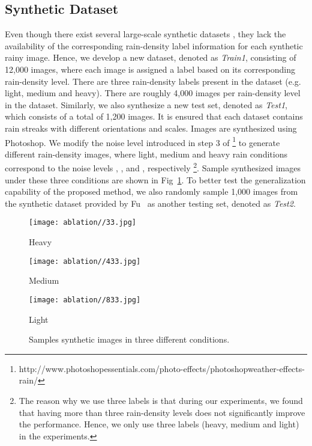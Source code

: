 \documentclass[10pt,twocolumn,letterpaper]{article}
\begin{document}
\subsection{Synthetic Dataset}
Even though there exist several large-scale synthetic datasets  \cite{derain_cvpr2017,derain_2017_zhang,derain_cvpr2017_multi}, they lack the availability of  the  corresponding rain-density label information for each synthetic rainy image.   Hence, we develop a new dataset, denoted as \emph{Train1}, consisting of 12,000 images, where each image is assigned a label  based on its corresponding rain-density level.  There are three rain-density labels present in the dataset (e.g. light, medium and heavy).  There are roughly 4,000 images per rain-density level in the dataset. Similarly, we also synthesize a new test set, denoted as \emph{Test1}, which consists of a total of 1,200 images.   It is ensured that each dataset contains rain streaks with different orientations  and scales.   Images are synthesized using Photoshop.   We modify the noise level introduced in step 3  of \footnote{http://www.photoshopessentials.com/photo-effects/photoshopweather-effects-rain/}
to generate different rain-density images, where light, medium and heavy rain conditions correspond to the noise levels , , and , respectively \footnote{The reason why we use three labels is that during our experiments, we found that having more than three rain-density levels does not significantly improve the performance. Hence, we only use  three labels (heavy, medium and light) in the experiments.}.   Sample synthesized images under these three conditions are shown in Fig~\ref{fig:sample}.   To better test the  generalization capability of the proposed method, we  also randomly sample 1,000 images from the  synthetic dataset provided by Fu~\cite{derain_cvpr2017} as another testing set, denoted as \emph{Test2}. 

  \begin{figure}[htp!]
 	\centering
 	\begin{minipage}{.155\textwidth}
 		\centering
 		\texttt{[image: ablation//33.jpg]}
 		\captionsetup{labelformat=empty}
 		\captionsetup{justification=centering}
 		\vskip-10pt
 		\caption*{Heavy} 
 	\end{minipage}
 	\begin{minipage}{.155\textwidth}
 		\centering
 		\texttt{[image: ablation//433.jpg]}
 		\captionsetup{labelformat=empty}
 		\captionsetup{justification=centering}
 		\vskip-10pt
 		\caption*{Medium} 
 	\end{minipage}
 	\begin{minipage}{.155\textwidth}
 		\centering
 		\texttt{[image: ablation//833.jpg]}
 		\captionsetup{labelformat=empty}
 		\captionsetup{justification=centering}
 		\vskip-10pt
 		\caption*{Light} 
 	\end{minipage}
 	\vskip -10pt\caption{Samples synthetic images in three different conditions.} \label{fig:sample}
 \end{figure}
\end{document}
